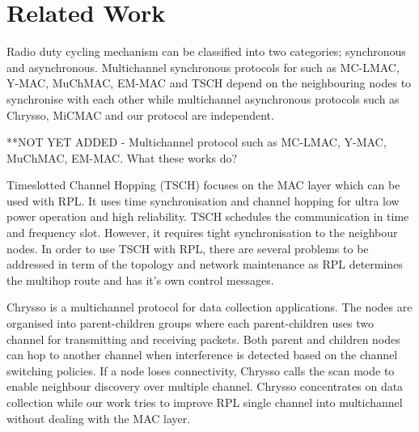 \section{Related Work}

Radio duty cycling mechanism can be classified into two categories; synchronous and asynchronous. Multichannel synchronous protocols for such as MC-LMAC, Y-MAC, MuChMAC, EM-MAC and TSCH depend on the neighbouring nodes to synchronise with each other while multichannel asynchronous protocols such as Chrysso, MiCMAC and our protocol are independent.

**NOT YET ADDED - Multichannel protocol such as MC-LMAC, Y-MAC, MuChMAC, EM-MAC. What these works do?


Timeslotted Channel Hopping (TSCH) \cite{tsch} focuses on the MAC layer which can be used with RPL. It uses time synchronisation and channel hopping for ultra low power operation and high reliability. TSCH schedules the communication in time and frequency slot. However, it requires tight synchronisation to the neighbour nodes. In order to use TSCH with RPL, there are several problems to be addressed in term of the topology and network maintenance as RPL determines the multihop route and has it's own control messages.


Chrysso \cite{chrysso} is a multichannel protocol for data collection applications. The nodes are organised into parent-children groups where each parent-children uses two channel for transmitting and receiving packets. Both parent and children nodes can hop to another channel when interference is detected based on the channel switching policies. If a node loses connectivity, Chrysso calls the scan mode to enable neighbour discovery over multiple channel. Chrysso concentrates on data collection while our work tries to improve RPL single channel into multichannel without dealing with the MAC layer. 

